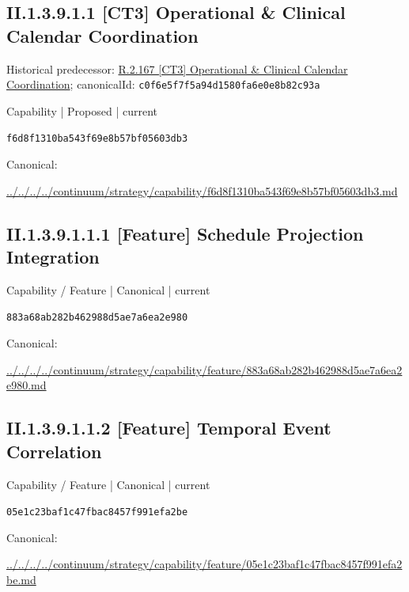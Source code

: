 \documentclass[10pt,a4paper]{article}
\begin{document}
\subsection*{II.1.3.9.1.1 [CT3] Operational \& Clinical Calendar Coordination}
Historical predecessor: \hyperref[element-c0f6e5f7f5a94d1580fa6e0e8b82c93a]{R.2.167 [CT3] Operational \& Clinical Calendar Coordination}; canonicalId: \texttt{c0f6e5f7f5a94d1580fa6e0e8b82c93a}\par
\label{element-f6d8f1310ba543f69e8b57bf05603db3}
{\small Capability | Proposed | current}\par
\texttt{f6d8f1310ba543f69e8b57bf05603db3}\par
Canonical: \par
{\footnotesize\url{../../../../continuum/strategy/capability/f6d8f1310ba543f69e8b57bf05603db3.md}}\par
\subsection*{II.1.3.9.1.1.1 [Feature] Schedule Projection Integration}
\label{element-883a68ab282b462988d5ae7a6ea2e980}
{\small Capability / Feature | Canonical | current}\par
\texttt{883a68ab282b462988d5ae7a6ea2e980}\par
Canonical: \par
{\footnotesize\url{../../../../continuum/strategy/capability/feature/883a68ab282b462988d5ae7a6ea2e980.md}}\par
\subsection*{II.1.3.9.1.1.2 [Feature] Temporal Event Correlation}
\label{element-05e1c23baf1c47fbac8457f991efa2be}
{\small Capability / Feature | Canonical | current}\par
\texttt{05e1c23baf1c47fbac8457f991efa2be}\par
Canonical: \par
{\footnotesize\url{../../../../continuum/strategy/capability/feature/05e1c23baf1c47fbac8457f991efa2be.md}}\par
\end{document}
